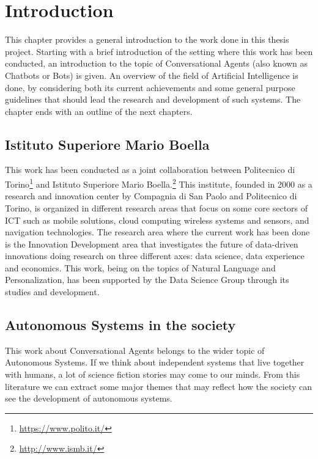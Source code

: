 


\chapter{Introduction}
This chapter provides a general introduction to the work done in this thesis project. Starting with a brief introduction of the setting where this work has been conducted, an introduction to the topic of Conversational Agents (also known as Chatbots or Bots) is given. An overview of the field of Artificial Intelligence is done, by considering both its current achievements and some general purpose guidelines that should lead the research and development of such systems. The chapter ends with an outline of the next chapters.

\section{Istituto Superiore Mario Boella}
This work has been conducted as a joint collaboration between Politecnico di Torino\footnote{\url{https://www.polito.it/}} and Istituto Superiore Mario Boella.\footnote{\url{http://www.ismb.it/}} This institute, founded in 2000 as a research and innovation center by Compagnia di San Paolo and Politecnico di Torino, is organized in different research areas that focus on some core sectors of ICT such as mobile solutions, cloud computing wireless systems and sensors, and navigation technologies. The research area where the current work has been done is the Innovation Development area that investigates the future of data-driven innovations doing research on three different axes: data science, data experience and economics. This work, being on the topics of Natural Language and Personalization, has been supported by the Data Science Group through its studies and development.

\section{Autonomous Systems in the society}
This work about Conversational Agents belongs to the wider topic of Autonomous Systems. If we think about independent systems that live together with humans, a lot of science fiction stories may come to our minds. From this literature we can extract some major themes that may reflect how the society can see the development of autonomous systems.

